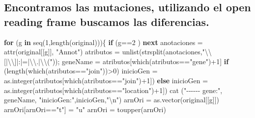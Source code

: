 \documentclass[
]{article}
\newenvironment{Shaded}{\begin{snugshade}}{\end{snugshade}}
\newcommand{\ControlFlowTok}[1]{\textcolor[rgb]{0.13,0.29,0.53}{\textbf{#1}}}
\newcommand{\DecValTok}[1]{\textcolor[rgb]{0.00,0.00,0.81}{#1}}
\newcommand{\FunctionTok}[1]{\textcolor[rgb]{0.00,0.00,0.00}{#1}}
\newcommand{\NormalTok}[1]{#1}
\newcommand{\OtherTok}[1]{\textcolor[rgb]{0.56,0.35,0.01}{#1}}
\newcommand{\SpecialCharTok}[1]{\textcolor[rgb]{0.00,0.00,0.00}{#1}}
\newcommand{\StringTok}[1]{\textcolor[rgb]{0.31,0.60,0.02}{#1}}
\begin{document}
\hypertarget{encontramos-las-mutaciones-utilizando-el-open-reading-frame-buscamos-las-diferencias.-1}{%
\subsection{Encontramos las mutaciones, utilizando el open reading frame
buscamos las
diferencias.}\label{encontramos-las-mutaciones-utilizando-el-open-reading-frame-buscamos-las-diferencias.-1}}

\begin{Shaded}
\begin{Highlighting}[]
\ControlFlowTok{for}\NormalTok{ (g }\ControlFlowTok{in} \FunctionTok{seq}\NormalTok{(}\DecValTok{1}\NormalTok{,}\FunctionTok{length}\NormalTok{(original)))\{}
  \ControlFlowTok{if}\NormalTok{ (g}\SpecialCharTok{==}\DecValTok{2}\NormalTok{ ) }\ControlFlowTok{next}
\NormalTok{  anotaciones }\OtherTok{=} \FunctionTok{attr}\NormalTok{(original[[g]], }\StringTok{"Annot"}\NormalTok{) }
\NormalTok{  atributos }\OtherTok{=} \FunctionTok{unlist}\NormalTok{(}\FunctionTok{strsplit}\NormalTok{(anotaciones,}\StringTok{"}\SpecialCharTok{\textbackslash{}\textbackslash{}}\StringTok{[|}\SpecialCharTok{\textbackslash{}\textbackslash{}}\StringTok{]|:|=|}\SpecialCharTok{\textbackslash{}\textbackslash{}}\StringTok{.|}\SpecialCharTok{\textbackslash{}\textbackslash{}}\StringTok{("}\NormalTok{)); }
\NormalTok{  geneName }\OtherTok{=}\NormalTok{ atributos[}\FunctionTok{which}\NormalTok{(atributos}\SpecialCharTok{==}\StringTok{"gene"}\NormalTok{)}\SpecialCharTok{+}\DecValTok{1}\NormalTok{] }
  \ControlFlowTok{if}\NormalTok{ (}\FunctionTok{length}\NormalTok{(}\FunctionTok{which}\NormalTok{(atributos}\SpecialCharTok{==}\StringTok{"join"}\NormalTok{))}\SpecialCharTok{\textgreater{}}\DecValTok{0}\NormalTok{) inicioGen }\OtherTok{=} \FunctionTok{as.integer}\NormalTok{(atributos[}\FunctionTok{which}\NormalTok{(atributos}\SpecialCharTok{==}\StringTok{"join"}\NormalTok{)}\SpecialCharTok{+}\DecValTok{1}\NormalTok{]) }
  \ControlFlowTok{else}\NormalTok{ inicioGen }\OtherTok{=} \FunctionTok{as.integer}\NormalTok{(atributos[}\FunctionTok{which}\NormalTok{(atributos}\SpecialCharTok{==}\StringTok{"location"}\NormalTok{)}\SpecialCharTok{+}\DecValTok{1}\NormalTok{]) }
  \FunctionTok{cat}\NormalTok{ (}\StringTok{"{-}{-}{-}{-}{-}{-} gene:"}\NormalTok{, geneName, }\StringTok{"inicioGen:"}\NormalTok{,inicioGen,}\StringTok{"}\SpecialCharTok{\textbackslash{}n}\StringTok{"}\NormalTok{)}
\NormalTok{  arnOri }\OtherTok{=} \FunctionTok{as.vector}\NormalTok{(original[[g]])}
\NormalTok{  arnOri[arnOri}\SpecialCharTok{==}\StringTok{"t"}\NormalTok{] }\OtherTok{=} \StringTok{"u"}
\NormalTok{  arnOri }\OtherTok{=} \FunctionTok{toupper}\NormalTok{(arnOri)}


\end{Highlighting}
\end{Shaded}
\end{document}
